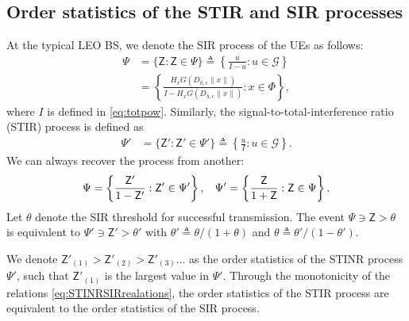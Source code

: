 \documentclass[lettersize,journal]{IEEEtran}
\begin{document}

    
  
    \subsection{Order statistics of the STIR and SIR processes}

 At the typical LEO BS, we denote the SIR process of the UEs as follows:
\begin{align}
  \label{eq:SINR}
  \Psi &= \{\mathsf{Z}: \mathsf{Z} \in \Psi\} \triangleq \left\{ \frac{u}{I-u} : u \in \mathcal{G}\right\} \nonumber \\
  &=\left\{ \frac{H_x G(D_{h,\epsilon}\|x\|)}{I-H_x G(D_{h,\epsilon}\|x\|)} : x \in \Phi\right\},
\end{align}
where $I$ is defined in \eqref{eq:totpow}. Similarly, the signal-to-total-interference ratio (STIR) process is defined as
\begin{align}
  \label{eq:STINR}
  \Psi' &= \{\mathsf{Z}': \mathsf{Z}' \in \Psi'\} \triangleq \left\{ \frac{u}{I} : u \in \mathcal{G}\right\}.
\end{align}
We can always recover the process from another:
\begin{equation}
  \label{eq:STINRSIRrealations}
  \Psi = \left\{ \frac{\mathsf{Z}'}{1- \mathsf{Z}'}: \mathsf{Z}' \in \Psi' \right\}, \hspace{0.3cm} \Psi' = \left\{ \frac{\mathsf{Z}}{1+ \mathsf{Z}}: \mathsf{Z} \in \Psi \right\}.
\end{equation}
Let $\theta$ denote the SIR threshold for successful transmission. The event $\Psi \ni\mathsf{Z}> \theta$ is equivalent to $\Psi' \ni \mathsf{Z}'> \theta'$  with $\theta' \triangleq \theta/(1+\theta)$ and $\theta \triangleq \theta'/(1-\theta')$. 
    
We denote $\mathsf{Z}'_{(1)}>\mathsf{Z}'_{(2)} >\mathsf{Z}'_{(3)} \dots$ as the order statistics of the STINR process $\Psi'$, such that $\mathsf{Z}'_{(1)}$ is the largest value in $\Psi'$. Through the monotonicity of the relations \eqref{eq:STINRSIRrealations}, the order statistics of the STIR process are equivalent to the order statistics of the SIR process.
\end{document}
